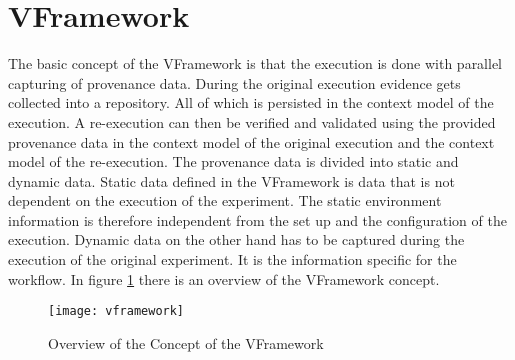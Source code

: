 \documentclass[draft,final]{vutinfth} %
\begin{document}

\section{VFramework}

The basic concept of the VFramework is that the execution is done with parallel capturing of provenance data. During the original execution evidence gets collected into a repository. All of which is persisted in the context model of the execution. A re-execution can then be verified and validated using the provided provenance data in the context model of the original execution and the context model of the re-execution. The provenance data is divided into static and dynamic data. Static data defined in the VFramework is data that is not dependent on the execution of the experiment. The static environment information is therefore independent from the set up and the configuration of the execution. Dynamic data on the other hand has to be captured during the execution of the original experiment. It is the information specific for the workflow. \cite{Miksa2013FrameworkFV}
In figure \ref{fig:vframework} there is an overview of the VFramework concept.  
\begin{figure}[h]
	\centering
	\texttt{[image: vframework]}
	\caption{Overview of the Concept of the VFramework \cite{Miksa2013FrameworkFV}}
	\label{fig:vframework} %
\end{figure}
\end{document}
